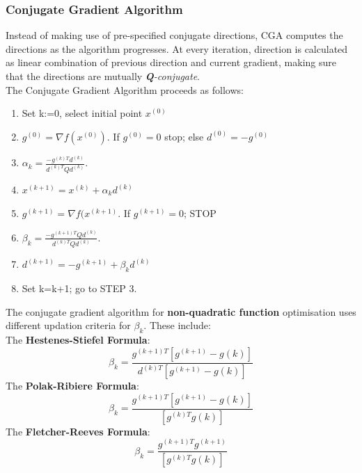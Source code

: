 \documentclass[12pt,a4paper,titlepage]{article}
\begin{document}
\subsubsection{Conjugate Gradient Algorithm}
Instead of making use of pre-specified conjugate directions, CGA computes the directions as the algorithm progresses. At every iteration, direction is calculated as linear combination of previous direction and current gradient, making sure that the directions are mutually \textit{\textbf{Q}-conjugate}.\\The Conjugate Gradient Algorithm proceeds as follows: 
\begin{enumerate}
    \item Set k:=0, select initial point $x^{(0)}$
    \item $g^{(0)}= \nabla f(x^{(0)}). $ If $g^{(0)} = 0$ stop; else $d^{(0)}= -g^{(0)}$
    \item $\alpha_{k}= \frac{-g^{(k)T}d^{(k)}}{d^{(k)T}Qd^{(k)}}.$
    \item $x^{(k+1)}  = x^{(k)}+ \alpha_{k}d^{(k)}$
    \item $g^{(k+1)}= \nabla f(x^{(k+1)}.$ If $g^{(k+1)}=0$; STOP
    \item $\beta_{k}= \frac{-g^{(k+1)T}Qd^{(k)}}{d^{(k)T}Qd^{(k)}}.$
    \item $d^{(k+1)}= -g^{(k+1)}+\beta_{k}d^{(k)} $
    \item Set k=k+1; go to STEP 3.
\end{enumerate}
The conjugate gradient algorithm for \textbf{non-quadratic function} optimisation uses different updation criteria for $\beta_{k}$. These include:
\\ The \textbf{Hestenes-Stiefel Formula}:
\begin{equation}
    \beta_{k}= \frac{g^{(k+1)T}[g^{(k+1)}-g{(k)}]}{d^{(k)T}[g^{(k+1)}-g{(k)}]}
\end{equation}
The \textbf{Polak-Ribiere Formula}:
\begin{equation}
    \beta_{k}= \frac{g^{(k+1)T}[g^{(k+1)}-g{(k)}]}{[g^{(k)T}g{(k)}]}
\end{equation}
The \textbf{Fletcher-Reeves Formula}:
\begin{equation}
        \beta_{k}= \frac{g^{(k+1)T}g^{(k+1)}}{[g^{(k)T}g{(k)}]}
\end{equation}
\end{document}
